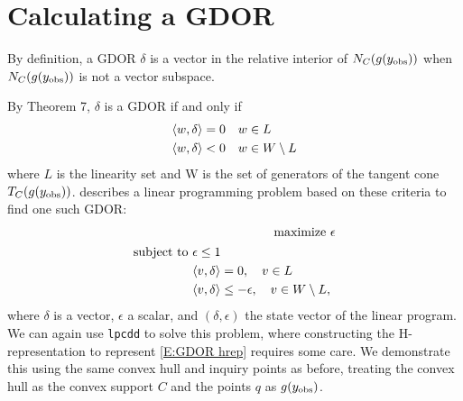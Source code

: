 \section{Calculating a GDOR} \label{S:GDOR calc}
By definition, a GDOR $\delta$ is a vector in the relative interior of $N_C(g(y_{\text{obs}}))$ when
$N_C(g(y_{\text{obs}}))$ is not a vector subspace.  

By Theorem 7, $\delta$ is a GDOR if and only if
\begin{align*}
	\langle w,\delta \rangle & = 0 	\quad w \in L\\
	\langle w,\delta \rangle & < 0 	\quad w \in W \setminus L
\end{align*}
where $L$ is the linearity set and W is the set of generators of 
the tangent cone $T_C(g(y_{\text{obs}}))$.
\citet{Geyer:gdor} describes a linear programming problem based on these
criteria to find one such GDOR:
\begin{align}
	\text{maximize } 	&\epsilon \label{E:GDOR objv} \\ 
	\begin{split}
	\text{subject to } 	&\epsilon \leq 1 \label{E:GDOR hrep}\\
	&\langle v,\delta \rangle = 0, \quad v \in L \\
	&\langle v,\delta \rangle \leq -\epsilon, \quad v \in W \setminus L,
	\end{split}
\end{align}
where $\delta$ is a vector, $\epsilon$ a scalar, and $(\delta, \epsilon)$ the state
vector of the linear program.  We can again use \texttt{lpcdd} to solve this 
problem, where constructing the H-representation to represent \eqref{E:GDOR hrep}
requires some care.  We demonstrate this using the same convex hull and inquiry points as 
before, treating the convex hull as the convex support $C$ and 
the points $q$ as $g(y_{\text{obs}})$.
